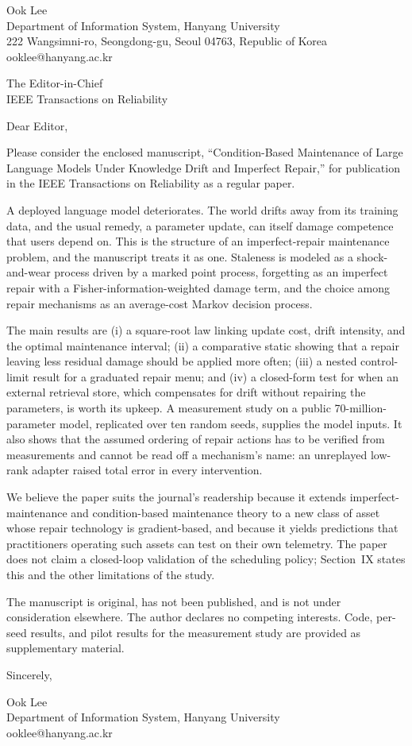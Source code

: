 \documentclass[11pt]{article}
\begin{document}
\noindent Ook Lee\\
Department of Information System, Hanyang University\\
222 Wangsimni-ro, Seongdong-gu, Seoul 04763, Republic of Korea\\
ooklee@hanyang.ac.kr

\medskip
\noindent [Date]

\medskip
\noindent The Editor-in-Chief\\
IEEE Transactions on Reliability

\medskip
\noindent Dear Editor,

Please consider the enclosed manuscript, ``Condition-Based Maintenance of Large Language Models Under Knowledge Drift and Imperfect Repair,'' for publication in the IEEE Transactions on Reliability as a regular paper.

A deployed language model deteriorates. The world drifts away from its training data, and the usual remedy, a parameter update, can itself damage competence that users depend on. This is the structure of an imperfect-repair maintenance problem, and the manuscript treats it as one. Staleness is modeled as a shock-and-wear process driven by a marked point process, forgetting as an imperfect repair with a Fisher-information-weighted damage term, and the choice among repair mechanisms as an average-cost Markov decision process.

The main results are (i) a square-root law linking update cost, drift intensity, and the optimal maintenance interval; (ii) a comparative static showing that a repair leaving less residual damage should be applied more often; (iii) a nested control-limit result for a graduated repair menu; and (iv) a closed-form test for when an external retrieval store, which compensates for drift without repairing the parameters, is worth its upkeep. A measurement study on a public 70-million-parameter model, replicated over ten random seeds, supplies the model inputs. It also shows that the assumed ordering of repair actions has to be verified from measurements and cannot be read off a mechanism's name: an unreplayed low-rank adapter raised total error in every intervention.

We believe the paper suits the journal's readership because it extends imperfect-maintenance and condition-based maintenance theory to a new class of asset whose repair technology is gradient-based, and because it yields predictions that practitioners operating such assets can test on their own telemetry. The paper does not claim a closed-loop validation of the scheduling policy; Section~IX states this and the other limitations of the study.

The manuscript is original, has not been published, and is not under consideration elsewhere. The author declares no competing interests. Code, per-seed results, and pilot results for the measurement study are provided as supplementary material.

Sincerely,

\medskip
Ook Lee\\
Department of Information System, Hanyang University\\
ooklee@hanyang.ac.kr
\end{document}
